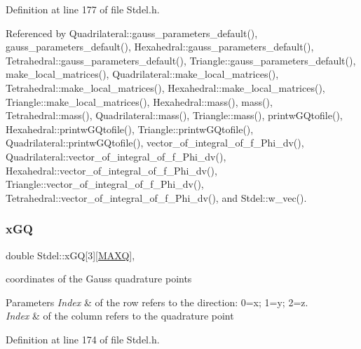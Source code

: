 Definition at line 177 of file Stdel.\+h.



Referenced by Quadrilateral\+::gauss\+\_\+parameters\+\_\+default(), gauss\+\_\+parameters\+\_\+default(), Hexahedral\+::gauss\+\_\+parameters\+\_\+default(), Tetrahedral\+::gauss\+\_\+parameters\+\_\+default(), Triangle\+::gauss\+\_\+parameters\+\_\+default(), make\+\_\+local\+\_\+matrices(), Quadrilateral\+::make\+\_\+local\+\_\+matrices(), Tetrahedral\+::make\+\_\+local\+\_\+matrices(), Hexahedral\+::make\+\_\+local\+\_\+matrices(), Triangle\+::make\+\_\+local\+\_\+matrices(), Hexahedral\+::mass(), mass(), Tetrahedral\+::mass(), Quadrilateral\+::mass(), Triangle\+::mass(), printw\+G\+Qtofile(), Hexahedral\+::printw\+G\+Qtofile(), Triangle\+::printw\+G\+Qtofile(), Quadrilateral\+::printw\+G\+Qtofile(), vector\+\_\+of\+\_\+integral\+\_\+of\+\_\+f\+\_\+\+Phi\+\_\+dv(), Quadrilateral\+::vector\+\_\+of\+\_\+integral\+\_\+of\+\_\+f\+\_\+\+Phi\+\_\+dv(), Hexahedral\+::vector\+\_\+of\+\_\+integral\+\_\+of\+\_\+f\+\_\+\+Phi\+\_\+dv(), Triangle\+::vector\+\_\+of\+\_\+integral\+\_\+of\+\_\+f\+\_\+\+Phi\+\_\+dv(), Tetrahedral\+::vector\+\_\+of\+\_\+integral\+\_\+of\+\_\+f\+\_\+\+Phi\+\_\+dv(), and Stdel\+::w\+\_\+vec().

\mbox{\label{classStdel_adedcb4d4faa12adf348054780a3b2c1a}} 
\subsubsection{\texorpdfstring{x\+GQ}{xGQ}}
{\footnotesize\ttfamily double Stdel\+::x\+GQ\mbox{[}3\mbox{]}\mbox{[}\hyperlink{MyOptions_8h_af708e94d886ba3f59582612949cac702}{M\+A\+XQ}\mbox{]}\hspace{0.3cm}{\ttfamily [protected]}, {\ttfamily [inherited]}}

coordinates of the Gauss quadrature points 
\begin{DoxyParams}{Parameters}
{\em Index} & of the row refers to the direction\+: 0=x; 1=y; 2=z. \\
\hline
{\em Index} & of the column refers to the quadrature point \\
\hline
\end{DoxyParams}


Definition at line 174 of file Stdel.\+h.



